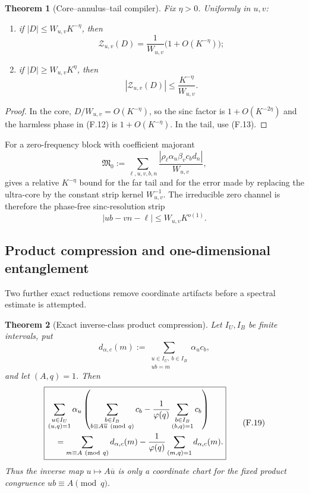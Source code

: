 \documentclass[11pt]{article}
\newtheorem{theorem}{Theorem}[section]
\theoremstyle{definition}
\theoremstyle{remark}
\begin{document}
\begin{theorem}[Core--annulus--tail compiler]
\label{thm:freq-core-tail}
Fix $\eta>0$.  Uniformly in $u,v$:
\begin{enumerate}[label=\textup{(\roman*)},leftmargin=3em]
\item if $|D|\le W_{u,v}K^{-\eta}$, then
\[
 \mathscr Z_{u,v}(D)
 =\frac1{W_{u,v}}\bigl(1+O(K^{-\eta})\bigr);
 \tag{F.15}
\]
\item if $|D|\ge W_{u,v}K^{\eta}$, then
\[
 |\mathscr Z_{u,v}(D)|
 \le\frac{K^{-\eta}}{W_{u,v}}.
 \tag{F.16}
\]
\end{enumerate}
\end{theorem}

\begin{proof}
In the core, $D/W_{u,v}=O(K^{-\eta})$, so the sinc factor is
$1+O(K^{-2\eta})$ and the harmless phase in \textup{(F.12)} is
$1+O(K^{-\eta})$.  In the tail, use \textup{(F.13)}.
\end{proof}

For a zero-frequency block with coefficient majorant
\[
 \mathfrak M_0
 :=\sum_{\ell,u,v,b,n}
   \frac{|\rho_\ell\alpha_u\beta_vc_bd_n|}{W_{u,v}},
 \tag{F.17}
\]
 gives a relative $K^{-\eta}$ bound for the far tail
and for the error made by replacing the ultra-core by the constant strip
kernel $W_{u,v}^{-1}$.  The irreducible zero channel is therefore the
phase-free sinc-resolution strip
\[
 \boxed{|ub-vn-\ell|\le W_{u,v}K^{o(1)}.}
 \tag{F.18}
\]

\subsection{Product compression and one-dimensional entanglement}

Two further exact reductions remove coordinate artifacts before a spectral
estimate is attempted.

\begin{theorem}[Exact inverse-class product compression]
\label{thm:freq-product-compression}
Let $I_U,I_B$ be finite intervals, put
\[
 d_{\alpha,c}(m)
 :=\sum_{\substack{u\in I_U,\ b\in I_B\\ub=m}}\alpha_uc_b,
\]
and let $(A,q)=1$.  Then
\[
 \boxed{
 \begin{aligned}
 &\sum_{\substack{u\in I_U\\(u,q)=1}}\alpha_u
 \left(
  \sum_{\substack{b\in I_B\\b\equiv A\overline u\ ({\rm mod}\ q)}}c_b
  -\frac1{\varphi(q)}
   \sum_{\substack{b\in I_B\\(b,q)=1}}c_b
 \right)\\
 &\quad=
 \sum_{m\equiv A\ ({\rm mod}\ q)}d_{\alpha,c}(m)
 -\frac1{\varphi(q)}
  \sum_{(m,q)=1}d_{\alpha,c}(m).
 \end{aligned}}
 \tag{F.19}
\]
Thus the inverse map $u\mapsto A\overline u$ is only a coordinate chart for
the fixed product congruence $ub\equiv A\pmod q$.
\end{theorem}
\end{document}
